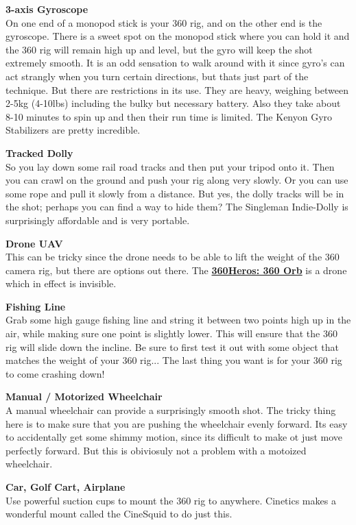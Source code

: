 \begin{fullwidth}
{\bf 3-axis Gyroscope}
\\
On one end of a monopod stick is your 360 rig, and on the other end is the gyroscope. There is a sweet spot on the monopod stick where you can hold it and the 360 rig will remain high up and level, but the gyro will keep the shot extremely smooth. It is an odd sensation to walk around with it since gyro's can act strangly when you turn certain directions, but thats just part of the technique. But there are restrictions in its use. They are heavy, weighing between 2-5kg (4-10lbs) including the bulky but necessary battery. Also they take about 8-10 minutes to spin up and then their run time is limited. The Kenyon Gyro Stabilizers are pretty incredible.

{\bf Tracked Dolly}
\\
So you lay down some rail road tracks and then put your tripod onto it. Then you can crawl on the ground and push your rig along very slowly. Or you can use some rope and pull it slowly from a distance. But yes, the dolly tracks will be in the shot; perhaps you can find a way to hide them? The Singleman Indie-Dolly is surprisingly affordable and is very portable. 

{\bf Drone UAV}
\\
This can be tricky since the drone needs to be able to lift the weight of the 360 camera rig, but there are options out there. The \textbf{\href{http://youtu.be/-5iUZybKXr0}{360Heros: 360 Orb}} is a drone which in effect is invisible.



{\bf Fishing Line}
\\
Grab some high gauge fishing line and string it between two points high up in the air, while making sure one point is slightly lower. This will ensure that the 360 rig will slide down the incline. Be sure to first test it out with some object that matches the weight of your 360 rig... The last thing you want is for your 360 rig to come crashing down!

{\bf Manual / Motorized Wheelchair}
\\
A manual wheelchair can provide a surprisingly smooth shot. The tricky thing here is to make sure that you are pushing the wheelchair evenly forward. Its easy to accidentally get some shimmy motion, since its difficult to make ot just move perfectly forward. But this is obiviosuly not a problem with a motoized wheelchair. 

{\bf Car, Golf Cart, Airplane}
\\
Use powerful suction cups to mount the 360 rig to anywhere. Cinetics makes a wonderful mount called the CineSquid to do just this.





\clearpage
\end{fullwidth}
